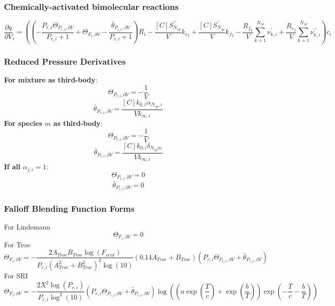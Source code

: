 \documentclass[a4paper,10pt]{article}
\newcommand{\ns}{N_{sp}}
\begin{document}
\subsubsection{Chemically-activated bimolecular reactions}
\begin{dmath} \frac{\partial q }{\partial V }_{i} = \left(\left(- \frac{P_{r, i} \Theta_{P_{r,i}, \partial V}}{P_{r, i} + 1} + \Theta_{F_i, \partial V} - \frac{\bar{\theta}_{P_{r, i}, \partial V}}{P_{r, i} + 1}\right) R_{i} - \frac{[C] S^{\prime\prime}_{\ns}}{V} {k_r}_{i} + \frac{[C] S^{\prime}_{\ns}}{V} {k_f}_{i} - \frac{{R_f}_{i}}{V} \sum_{k=1}^{\ns} \nu^{\prime}_{k,i} + \frac{{R_r}_{i}}{V} \sum_{k=1}^{\ns} \nu^{\prime\prime}_{k,i}\right) c_{i}\end{dmath} 
\subsubsection{Reduced Pressure Derivatives}
\textbf{For mixture as third-body}:
\begin{dmath} \Theta_{P_{r,i}, \partial V} = - \frac{1}{V}\end{dmath} 
\begin{dmath} \bar{\theta}_{P_{r, i}, \partial V} = \frac{[C] k_{0, i} \alpha_{\ns,i}}{V k_{\infty, i}}\end{dmath} 
\textbf{For species $m$ as third-body}:
\begin{dmath} \Theta_{P_{r,i}, \partial V} = - \frac{1}{V}\end{dmath} 
\begin{dmath} \bar{\theta}_{P_{r, i}, \partial V} = \frac{[C] k_{0, i} \delta_{\ns m}}{V k_{\infty, i}}\end{dmath} 
\textbf{If all $\alpha_{j,i} = 1$}:
\begin{dmath} \Theta_{P_{r,i}, \partial V} = 0\end{dmath} 
\begin{dmath} \bar{\theta}_{P_{r, i}, \partial V} = 0\end{dmath} 
\subsubsection{Falloff Blending Function Forms}
For Lindemann
\begin{dmath} \Theta_{F_i, \partial V} = 0\end{dmath} 
For Troe
\begin{dmath} \Theta_{F_i, \partial V} = - \frac{2 A_{Troe} B_{Troe} \log{\left (F_{cent} \right )}}{P_{r, i} \left(A_{Troe}^{2} + B_{Troe}^{2}\right)^{2} \log{\left (10 \right )}} \left(0.14 A_{Troe} + B_{Troe}\right) \left(P_{r, i} \Theta_{P_{r,i}, \partial V} + \bar{\theta}_{P_{r, i}, \partial V}\right)\end{dmath} 
For SRI
\begin{dmath} \Theta_{F_i, \partial V} = - \frac{2 X^{2} \log{\left (P_{r, i} \right )}}{P_{r, i} \log^{2}{\left (10 \right )}} \left(P_{r, i} \Theta_{P_{r,i}, \partial V} + \bar{\theta}_{P_{r, i}, \partial V}\right) \log{\left (\left(a \operatorname{exp}\left({\frac{T}{c}}\right) + \operatorname{exp}\left({\frac{b}{T}}\right)\right) \operatorname{exp}\left({- \frac{T}{c} - \frac{b}{T}}\right) \right )}\end{dmath} 
\end{document}
